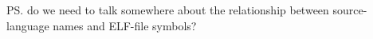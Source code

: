 

\ps{do we need to talk somewhere about the relationship between
  source-language names and ELF-file symbols?}



% 






